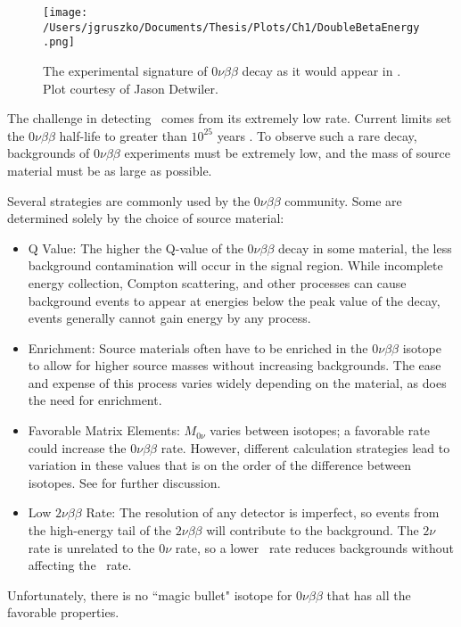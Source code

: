 \begin{figure}[]
\centering
\texttt{[image: /Users/jgruszko/Documents/Thesis/Plots/Ch1/DoubleBetaEnergy.png]} 
      \caption[The experimental signature of $0\nu\beta\beta$ decay as it would appear in ]{The experimental signature of $0\nu\beta\beta$ decay as it would appear in . Plot courtesy of Jason Detwiler.}
      \label{0nBBspectrum}  
\end{figure}

The challenge in detecting \nonubb\ comes from its extremely low rate. Current limits set the $0\nu\beta\beta$ half-life to greater than $10^{25}$ years \cite{EXO2014}. To observe such a rare decay, backgrounds of $0\nu\beta\beta$ experiments must be extremely low, and the mass of source material must be as large as possible. 

Several strategies are commonly used by the $0\nu\beta\beta$ community. Some are determined solely by the choice of source material:
\begin{itemize}
\item Q Value: The higher the Q-value of the $0\nu\beta\beta$ decay in some material, the less background contamination will occur in the signal region. While incomplete energy collection, Compton scattering, and other processes can cause background events to appear at energies below the peak value of the decay, events generally cannot gain energy by any process. 
\item Enrichment: Source materials often have to be enriched in the $0\nu\beta\beta$ isotope to allow for higher source masses without increasing backgrounds. The ease and expense of this process varies widely depending on the material, as does the need for enrichment.
\item Favorable Matrix Elements: $M_{0\nu}$ varies between isotopes; a favorable rate could increase the $0\nu\beta\beta$ rate. However, different calculation strategies lead to variation in these values that is on the order of the difference between isotopes. See \cite{Simkovic2009} for further discussion. 
\item Low $2\nu\beta\beta$ Rate: The resolution of any detector is imperfect, so events from the high-energy tail of the $2\nu\beta\beta$ will contribute to the background. The $2\nu$ rate is unrelated to the $0\nu$ rate, so a lower \twonubb\ rate reduces backgrounds without affecting the \nonubb\ rate.
\end{itemize} 
Unfortunately, there is no ``magic bullet" isotope for $0\nu\beta\beta$ that has all the favorable properties. 

